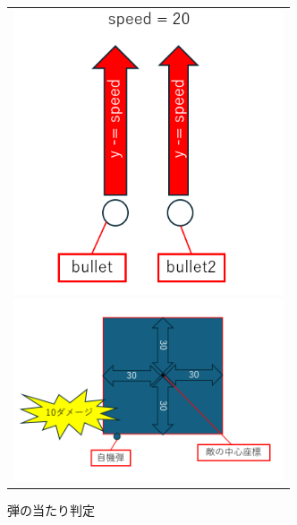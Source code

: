 \documentclass[a4paper,titlepage,11pt]{ltjsarticle}
\begin{document}
\begin{figure}[H]
\begin{center}
\begin{tabular}{c}
\begin{minipage}{0.5\hsize}
\begin{center}
\includegraphics[width=8cm]{move_bullet.png}
\end{center}
\caption{弾が上に動く仕組み}
\label{move_bullet}
\end{minipage}
\begin{minipage}{0.5\hsize}
\begin{center}
\includegraphics[width=8cm]{control_bullet.png}
\end{center}
\caption{弾の当たり判定}
\label{control_bullet}
\end{minipage}
\end{tabular}
\end{center}
\end{figure}
\end{document}
